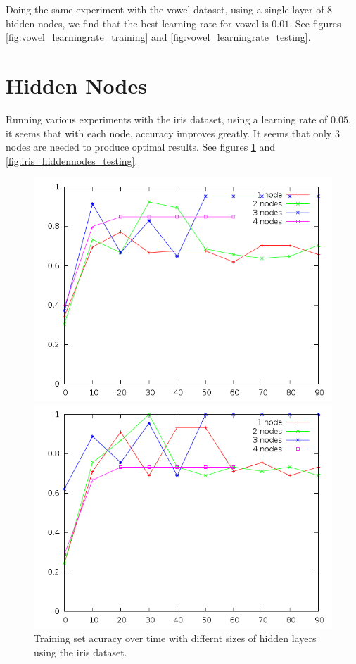 \documentclass[12pt]{article}
\begin{document}
Doing the same experiment with the vowel dataset, using a single layer of 8
hidden nodes, we find that the best learning rate for vowel is $0.01$. See
figures \ref{fig:vowel_learningrate_training} and \ref{fig:vowel_learningrate_testing}.

\section{Hidden Nodes}
Running various experiments with the iris dataset, using a learning rate of
$0.05$, it seems that with each node,
accuracy improves greatly. It seems that only $3$ nodes are needed to produce
optimal results. See figures
\ref{fig:iris_hiddennodes_training} and \ref{fig:iris_hiddennodes_testing}.
\begin{figure}[!ht]
    \centering
    \begin{minipage}[b]{0.45\linewidth}
        \includegraphics[width=1.0\textwidth]{iris-hiddennodes-training}
        \caption{Training set acuracy over time with differnt sizes of hidden layers using the iris dataset.}
        \label{fig:iris_hiddennodes_training}
    \end{minipage}
    \quad
    \begin{minipage}[b]{0.45\linewidth}
        \includegraphics[width=1.0\textwidth]{iris-hiddennodes-testing}

\end{minipage}
\end{figure}
\end{document}
